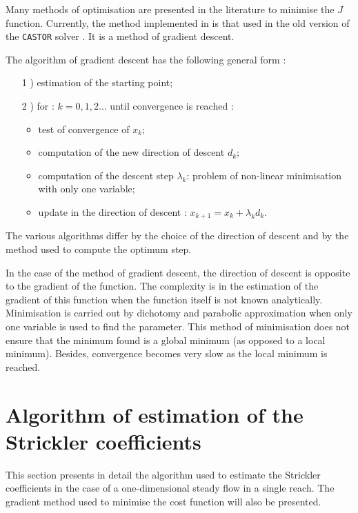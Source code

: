 Many methods of optimisation are presented in the literature to minimise the $J$ function. Currently, the method implemented in \mascaret{} is that used in the old version of the \texttt{CASTOR} solver \cite{LEBOSSE89_1}\cite{LEBOSSE89_2}\cite{LEBOSSE89_3}. It is a method of gradient descent.

The algorithm of gradient descent has the following general form :
\begin{itemize}
 \item[1]) estimation of the starting point;
 \item[2]) for : $k= 0,1,2...$ until convergence is reached :
   \begin{itemize}
     \item test of convergence of $x_k$;
     \item computation of the new direction of descent $d_k$;
     \item computation of the descent step $\lambda_k$: problem of non-linear minimisation with only one variable;
     \item update in the direction of descent : $x_{k+1} = x_k + \lambda_k d_k$.
   \end{itemize}
\end{itemize}

The various algorithms differ by the choice of the direction of descent and by the method used to compute the optimum step.

In the case of the method of gradient descent, the direction of descent is opposite to the gradient of the function. The complexity is in the estimation of the gradient of this function when the function itself is not known analytically. Minimisation is carried out by dichotomy and parabolic approximation when only one variable is used to find the parameter. This method of minimisation does not ensure that the minimum found is a global minimum (as opposed to a local minimum). Besides, convergence becomes very slow as the local minimum is reached.

\section{Algorithm of estimation of the Strickler coefficients}

This section presents in detail the algorithm used to estimate the Strickler coefficients in the case of a one-dimensional steady flow in a single reach. The gradient method used to minimise the cost function will also be presented.

